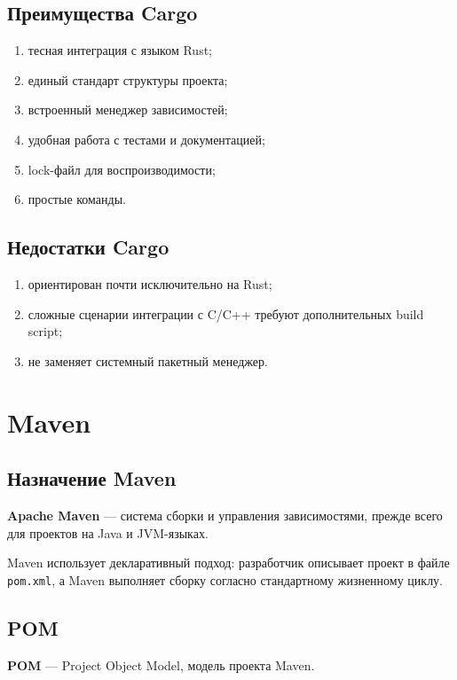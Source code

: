 \documentclass[12pt,a4paper]{article}
\begin{document}
\subsection{Преимущества Cargo}

\begin{enumerate}
    \item тесная интеграция с языком Rust;
    \item единый стандарт структуры проекта;
    \item встроенный менеджер зависимостей;
    \item удобная работа с тестами и документацией;
    \item lock-файл для воспроизводимости;
    \item простые команды.
\end{enumerate}

\subsection{Недостатки Cargo}

\begin{enumerate}
    \item ориентирован почти исключительно на Rust;
    \item сложные сценарии интеграции с C/C++ требуют дополнительных build script;
    \item не заменяет системный пакетный менеджер.
\end{enumerate}

\section{Maven}

\subsection{Назначение Maven}

\textbf{Apache Maven} --- система сборки и управления зависимостями, прежде всего для проектов на Java и JVM-языках.

Maven использует декларативный подход: разработчик описывает проект в файле \texttt{pom.xml}, а Maven выполняет сборку согласно стандартному жизненному циклу.

\subsection{POM}

\textbf{POM} --- Project Object Model, модель проекта Maven.
\end{document}
